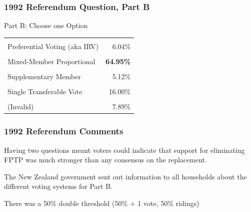 \documentclass[14pt,t,hyperref={colorlinks=true,urlcolor=red}]{beamer}
\begin{document}

\begin{frame}
\frametitle{1992 Referendum Question, Part B}

\begin{block}{}
\begin{center}
Part B: Choose one Option
\begin{tabular}[c]{l|r}
\hline
 & \\
Preferential Voting (aka IRV) & 6.04\% \\
\hline
 & \\
Mixed-Member Proportional & \textbf{64.95\%} \\
\hline
 & \\
Supplementary Member & 5.12\% \\
\hline
 & \\
Single Transferable Vote & 16.00\% \\
\hline
 & \\
(Invalid) & 7.89\% \\
\hline
\end{tabular}
\end{center}
\end{block}



\end{frame}




\begin{frame}
\frametitle{1992 Referendum Comments}

\begin{itemize*}

\item Having two questions meant voters could indicate that 
support for eliminating FPTP was much stronger than any consensus on
the replacement. 

\item The New Zealand government sent out information to all
households about the different voting systems for Part B. 

\item There was a 50\% double threshold (50\% + 1 vote, 50\% ridings)

\end{itemize*}

\end{frame}

\end{document}
